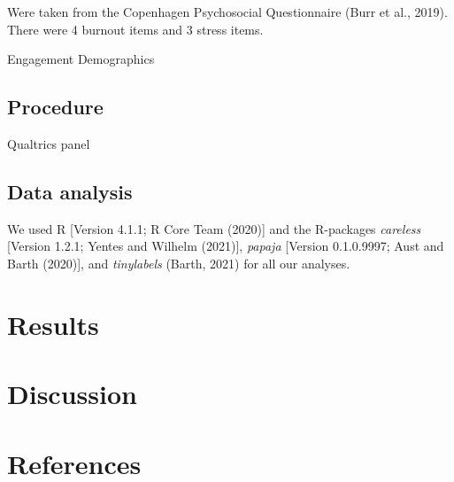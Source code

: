 \documentclass[
  english,
  man]{apa6}
\begin{document}
Were taken from the Copenhagen Psychosocial Questionnaire (Burr et al., 2019). There were 4 burnout items and 3 stress items.

Engagement
Demographics

\hypertarget{procedure}{%
\subsection{Procedure}\label{procedure}}

Qualtrics panel

\hypertarget{data-analysis}{%
\subsection{Data analysis}\label{data-analysis}}

We used R {[}Version 4.1.1; R Core Team (2020){]} and the R-packages \emph{careless} {[}Version 1.2.1; Yentes and Wilhelm (2021){]}, \emph{papaja} {[}Version 0.1.0.9997; Aust and Barth (2020){]}, and \emph{tinylabels} (Barth, 2021) for all our analyses.

\hypertarget{results-1}{%
\section{Results}\label{results-1}}

\hypertarget{discussion-1}{%
\section{Discussion}\label{discussion-1}}

\newpage

\hypertarget{references}{%
\section{References}\label{references}}

\begingroup
\setlength{\parindent}{-0.5in}
\setlength{\leftskip}{0.5in}
\end{document}
